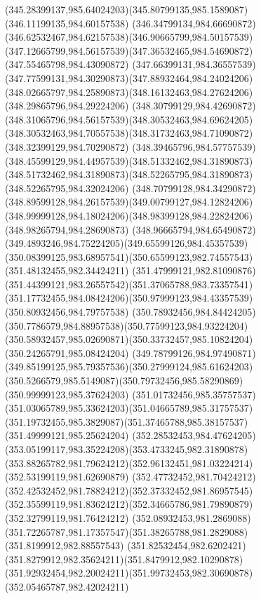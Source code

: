 {{  \curveto(345.28399137,985.64024203)(345.80799135,985.1589087)(346.11199135,984.60157538)
  \curveto(346.34799134,984.66690872)(346.62532467,984.62157538)(346.90665799,984.50157539)
  \curveto(347.12665799,984.56157539)(347.36532465,984.54690872)(347.55465798,984.43090872)
  \curveto(347.66399131,984.36557539)(347.77599131,984.30290873)(347.88932464,984.24024206)
  \curveto(348.02665797,984.25890873)(348.16132463,984.27624206)(348.29865796,984.29224206)
  \curveto(348.30799129,984.42690872)(348.31065796,984.56157539)(348.30532463,984.69624205)
  \curveto(348.30532463,984.70557538)(348.31732463,984.71090872)(348.32399129,984.70290872)
  \curveto(348.39465796,984.57757539)(348.45599129,984.44957539)(348.51332462,984.31890873)
  \curveto(348.51732462,984.31890873)(348.52265795,984.31890873)(348.52265795,984.32024206)
  \curveto(348.70799128,984.34290872)(348.89599128,984.26157539)(349.00799127,984.12824206)
  \curveto(348.99999128,984.18024206)(348.98399128,984.22824206)(348.98265794,984.28690873)
  \curveto(348.96665794,984.65490872)(349.4893246,984.75224205)(349.65599126,984.45357539)
  \curveto(350.08399125,983.68957541)(350.65599123,982.74557543)(351.48132455,982.34424211)
  \curveto(351.47999121,982.81090876)(351.44399121,983.26557542)(351.37065788,983.73357541)
  \curveto(351.17732455,984.08424206)(350.97999123,984.43357539)(350.80932456,984.79757538)
  \curveto(350.78932456,984.84424205)(350.7786579,984.88957538)(350.77599123,984.93224204)
  \curveto(350.58932457,985.02690871)(350.33732457,985.10824204)(350.24265791,985.08424204)
  \curveto(349.78799126,984.97490871)(349.85199125,985.79357536)(350.27999124,985.61624203)
  \curveto(350.5266579,985.5149087)(350.79732456,985.58290869)(350.99999123,985.37624203)
  \curveto(351.01732456,985.35757537)(351.03065789,985.33624203)(351.04665789,985.31757537)
  \curveto(351.19732455,985.3829087)(351.37465788,985.38157537)(351.49999121,985.25624204)
  \curveto(352.28532453,984.47624205)(353.05199117,983.35224208)(353.4733245,982.31890878)
  \curveto(353.88265782,981.79624212)(352.96132451,981.03224214)(352.53199119,981.62690879)
  \curveto(352.47732452,981.70424212)(352.42532452,981.78824212)(352.37332452,981.86957545)
  \curveto(352.35599119,981.83624212)(352.34665786,981.79890879)(352.32799119,981.76424212)
  \curveto(352.08932453,981.2869088)(351.72265787,981.17357547)(351.38265788,981.2829088)
  \moveto(351.8199912,982.88557543)
  \curveto(351.82532454,982.6202421)(351.8279912,982.35624211)(351.8479912,982.10290878)
  \curveto(351.92932454,982.20024211)(351.99732453,982.30690878)(352.05465787,982.42024211)
}}
